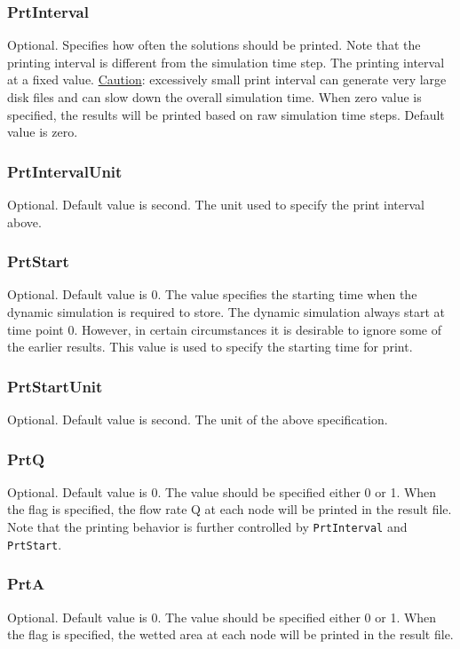 \documentclass[10pt, letterpaper]{article}
\begin{document}
\subsubsection{PrtInterval}
\label{subsubsec:prtint}
Optional. Specifies how often the solutions should be printed. Note that the printing
interval is different from the simulation time step.  The printing interval at a fixed
value.  \underline{Caution}: excessively small print interval can generate very large disk
files and can slow down the overall simulation time. When zero value is
specified, the results will be printed based on raw simulation time steps. Default value is
zero.

\subsubsection{PrtIntervalUnit}
\label{subsubsec:prtintunit}
Optional. Default value is second. The unit used to specify the print interval above.

\subsubsection{PrtStart}
\label{subsubsec:prtstart}
Optional. Default value is 0. The value specifies the starting time when the dynamic
simulation is required to store. The dynamic simulation always start at time point
0. However, in certain circumstances it is desirable to ignore some of the earlier
results. This value is used to specify the starting time for print.

\subsubsection{PrtStartUnit}
\label{subsubsec:prtsttunit}
Optional. Default value is second. The unit of the above specification.

\subsubsection{PrtQ}
\label{subsubsec:prtq}
Optional. Default value is 0. The value should be specified either 0 or 1. When the flag
is specified, the flow rate Q at each node will be printed in the result file. Note that
the printing behavior is further controlled by {\tt PrtInterval} and {\tt PrtStart}. 

\subsubsection{PrtA}
\label{subsubsec:prta}
Optional. Default value is 0. The value should be specified either 0 or 1. When the flag
is specified, the wetted area at each node will be printed in the result file.
\end{document}
